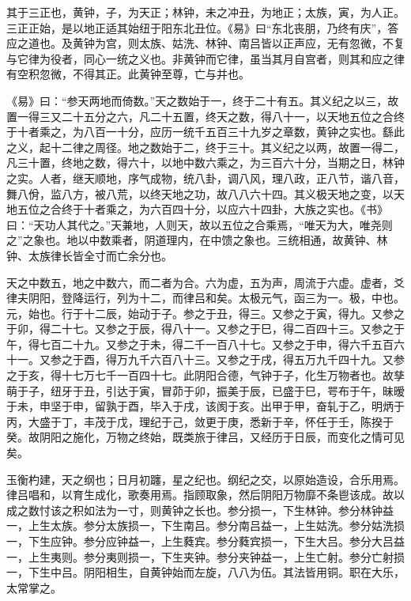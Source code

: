 \documentclass[12pt,UTF8]{ctexbook}
\begin{document}
其于三正也，黄钟，子，为天正；林钟，未之冲丑，为地正；太族，寅，为人正。三正正始，是以地正适其始纽于阳东北丑位。《易》曰“东北丧朋，乃终有庆”，答应之道也。及黄钟为宫，则太族、姑洗、林钟、南吕皆以正声应，无有忽微，不复与它律为役者，同心一统之义也。非黄钟而它律，虽当其月自宫者，则其和应之律有空积忽微，不得其正。此黄钟至尊，亡与并也。



《易》曰：“参天两地而倚数。”天之数始于一，终于二十有五。其义纪之以三，故置一得三又二十五分之六，凡二十五置，终天之数，得八十一，以天地五位之合终于十者乘之，为八百一十分，应历一统千五百三十九岁之章数，黄钟之实也。繇此之义，起十二律之周径。地之数始于二，终于三十。其义纪之以两，故置一得二，凡三十置，终地之数，得六十，以地中数六乘之，为三百六十分，当期之日，林钟之实。人者，继天顺地，序气成物，统八卦，调八风，理八政，正八节，谐八音，舞八佾，监八方，被八荒，以终天地之功，故八八六十四。其义极天地之变，以天地五位之合终于十者乘之，为六百四十分，以应六十四卦，大族之实也。《书》曰：“天功人其代之。”天兼地，人则天，故以五位之合乘焉，“唯天为大，唯尧则之”之象也。地以中数乘者，阴道理内，在中馈之象也。三统相通，故黄钟、林钟、太族律长皆全寸而亡余分也。



天之中数五，地之中数六，而二者为合。六为虚，五为声，周流于六虚。虚者，爻律夫阴阳，登降运行，列为十二，而律吕和矣。太极元气，函三为一。极，中也。元，始也。行于十二辰，始动于子。参之于丑，得三。又参之于寅，得九。又参之于卯，得二十七。又参之于辰，得八十一。又参之于巳，得二百四十三。又参之于午，得七百二十九。又参之于未，得二千一百八十七。又参之于申，得六千五百六十一。又参之于酉，得万九千六百八十三。又参之于戌，得五万九千四十九。又参之于亥，得十七万七千一百四十七。此阴阳合德，气钟于子，化生万物者也。故孳萌于子，纽牙于丑，引达于寅，冒茆于卯，振美于辰，已盛于巳，咢布于午，昧暧于未，申坚于申，留孰于酉，毕入于戌，该阂于亥。出甲于甲，奋轧于乙，明炳于丙，大盛于丁，丰茂于戊，理纪于己，敛更于庚，悉新于辛，怀任于壬，陈揆于癸。故阴阳之施化，万物之终始，既类旅于律吕，又经历于日辰，而变化之情可见矣。



玉衡杓建，天之纲也；日月初躔，星之纪也。纲纪之交，以原始造设，合乐用焉。律吕唱和，以育生成化，歌奏用焉。指顾取象，然后阴阳万物靡不条鬯该成。故以成之数忖该之积如法为一寸，则黄钟之长也。参分损一，下生林钟。参分林钟益一，上生太族。参分太族损一，下生南吕。参分南吕益一，上生姑洗。参分姑洗损一，下生应钟。参分应钟益一，上生蕤宾。参分蕤宾损一，下生大吕。参分大吕益一，上生夷则。参分夷则损一，下生夹钟。参分夹钟益一，上生亡射。参分亡射损一，下生中吕。阴阳相生，自黄钟始而左旋，八八为伍。其法皆用铜。职在大乐，太常掌之。
\end{document}
